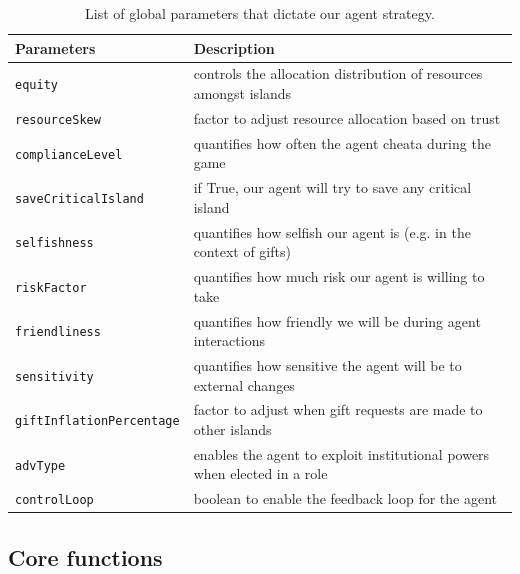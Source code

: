 \begin{center}
    
\begin{table}[H]
\centering
\begin{tabular}{l|l}
\textbf{Parameters} & \textbf{Description}  \\ 
\hline
\texttt{equity}                       & controls the allocation distribution of resources amongst islands              \\ \hdashline
\texttt{resourceSkew}                 & factor to adjust resource allocation based on trust             \\ \hdashline
\texttt{complianceLevel}              & quantifies how often the agent cheata during the game             \\ \hdashline
\texttt{saveCriticalIsland}           & if True, our agent will try to save any critical island             \\ \hdashline
\texttt{selfishness}                  & quantifies how selfish our agent is (e.g. in the context of gifts)             \\ \hdashline
\texttt{riskFactor}                   & quantifies how much risk our agent is willing to take        \\ \hdashline
\texttt{friendliness}                 & quantifies how friendly we will be during agent interactions            \\ \hdashline
\texttt{sensitivity}                  & quantifies how sensitive the agent will be to external changes            \\ \hdashline
\texttt{giftInflationPercentage}      & factor to adjust when gift requests are made to other islands             \\ \hdashline
\texttt{advType}                      & enables the agent to exploit institutional powers when elected in a role    \\ \hdashline
\texttt{controlLoop}                  & boolean to enable the feedback loop for the agent       
\end{tabular}
\caption{List of global parameters that dictate our agent strategy.}
\label{tab:team3:parameter_effects}
\end{table}
\end{center}

\subsection{Core functions}


